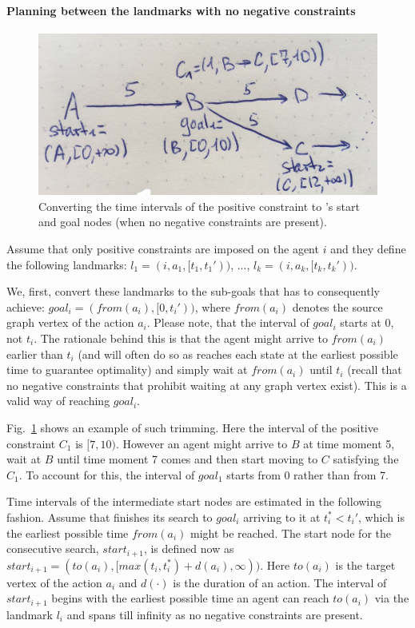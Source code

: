 \paragraph{Planning between the landmarks with no negative constraints}
\begin{figure}
    \centering
    \includegraphics[width=\columnwidth]{Example_trimming_intervals.jpeg}
    \caption{Converting the time intervals of the positive constraint to \sipp's start and goal nodes (when no negative constraints are present).}
    \label{fig:trimming_intervals}
\end{figure}


Assume that only positive constraints are imposed on the agent $i$ and they define the following landmarks: $l_1=(i, a_1, [t_1,t_1'))$, ..., $l_k=(i, a_k, [t_k,t_k'))$. 

We, first, convert these landmarks to the sub-goals that \sipp has to consequently achieve: $goal_i=(from(a_i), [0, t_i'))$, where $from(a_i)$ denotes the source graph vertex of the action $a_i$. Please note, that the interval of $goal_i$ starts at $0$, not $t_i$. The rationale behind this is that the agent might arrive to $from(a_i)$ earlier than $t_i$ (and will often do so as \sipp reaches each state at the earliest possible time to guarantee optimality) and simply wait at $from(a_i)$ until $t_i$ (recall that no negative constraints that prohibit waiting at any graph vertex exist). This is a valid way of reaching $goal_i$.

Fig.~\ref{fig:trimming_intervals} shows an example of such trimming. Here the interval of the positive constraint $C_1$ is $[7, 10)$. However an agent might arrive to $B$ at time moment 5, wait at $B$ until time moment 7 comes and then start moving to $C$ satisfying the $C_1$. To account for this, the interval of $goal_1$ starts from 0 rather than from 7.

Time intervals of the intermediate start nodes are estimated in the following fashion. Assume that \sipp finishes its search to $goal_i$ arriving to it at $t_i^* < t_i'$, which is the earliest possible time $from(a_i)$ might be reached. The start node for the consecutive search, $start_{i+1}$, is defined now as $start_{i+1}=(to(a_i), [max(t_i, t_i^*) + d(a_i), \infty))$. Here $to(a_i)$ is the target vertex of the action $a_i$ and $d(\cdot)$ is the duration of an action. The interval of $start_{i+1}$ begins with the earliest possible time an agent can reach $to(a_i)$ via the landmark $l_i$ and spans till infinity as no negative constraints are present.

